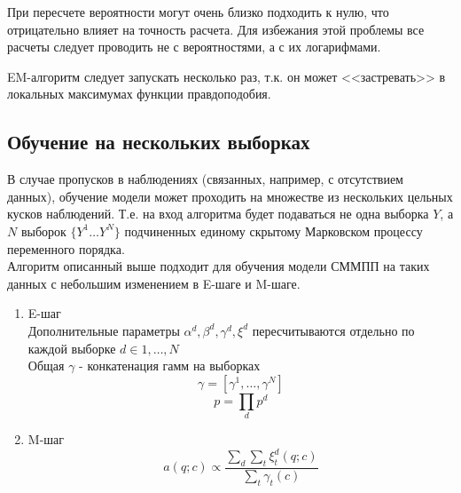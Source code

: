 \documentclass{matmex-diploma-custom}
\begin{document}
\begin{remark} При пересчете вероятности могут очень близко подходить к нулю, что отрицательно влияет на точность расчета. Для избежания этой проблемы все расчеты следует проводить не с вероятностями, а с их логарифмами.
\end{remark}
\begin{remark} EM-алгоритм следует запускать несколько раз, т.к. он может <<застревать>> в локальных максимумах функции правдоподобия.
\end{remark}

\subsection{Обучение на нескольких выборках}
В случае пропусков в наблюдениях (связанных, например, с отсутствием данных), обучение модели может проходить на множестве из нескольких цельных кусков наблюдений.
Т.е. на вход алгоритма будет подаваться не одна выборка $Y$, а                                                                                                                                                                                                                                                                                                                                                                                                                                                                                                                                                                                                                                                              $ N $ выборок $ \{Y^{1} \ldots Y^{N}\}$ подчиненных единому скрытому Марковском процессу переменного порядка.
\\
Алгоритм описанный выше подходит для обучения модели СММПП на таких данных с небольшим изменением в E-шаге и M-шаге.
\\
\begin{enumerate}
\item E-шаг\\
Дополнительные параметры $\alpha^{d}, \beta^{d}, \gamma^{d}, \xi^{d}$ пересчитываются отдельно по каждой выборке $d \in {1, \ldots, N}$
\\
Общая $\gamma$ - конкатенация гамм на выборках
$$ \gamma = [\gamma^{1}, \ldots ,\gamma^{N}] $$
$$ p = \prod_{d}{p^{d}}$$
\item M-шаг\\
$$ a(q; c) \propto \frac{\sum_{d}{\sum_{t}{\xi^{d}_{t}(q;c)}}}{\sum_{t}{\gamma_{t}(c)}} $$
\end{enumerate}
\end{document}
